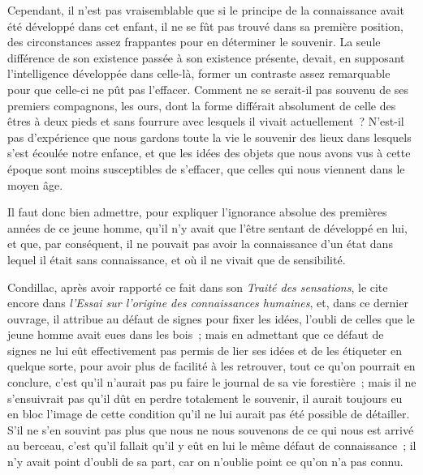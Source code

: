 \documentclass[french,twoside]{book} %
\begin{document}
Cependant, il n’est pas vraisemblable que si le principe de la connaissance avait été développé dans cet enfant, il ne se fût pas trouvé dans sa première position, des circonstances assez frappantes pour en déterminer le souvenir. La seule différence de son existence passée à son existence présente, devait, en supposant l’intelligence développée dans celle-là, former un contraste assez remarquable pour que celle-ci ne pût pas l’effacer. Comment ne se serait-il pas souvenu de ses premiers compagnons, les ours, dont la forme différait absolument de celle des êtres à deux pieds et sans fourrure avec lesquels il vivait actuellement ? N’est-il pas d’expérience que nous gardons toute la vie le souvenir des lieux dans lesquels s’est écoulée notre enfance, et que les idées des objets que nous avons vus à cette époque sont moins susceptibles de s’effacer, que celles qui nous viennent dans le moyen âge.\par
Il faut donc bien admettre, pour expliquer l’ignorance absolue des premières années de ce jeune homme, qu’il n’y avait que l’être sentant de développé en lui, et que, par conséquent, il ne pouvait pas avoir la connaissance d’un état dans lequel il était sans connaissance, et où il ne vivait que de sensibilité.\par
Condillac, après avoir rapporté ce fait dans son {\itshape Traité des sensations}, le cite encore dans {\itshape l’Essai sur l’origine des connaissances humaines}, et, dans ce dernier ouvrage, il attribue au défaut de signes pour fixer les idées, l’oubli de celles que le jeune homme avait eues dans les bois ; mais en admettant que ce défaut de signes ne lui eût effectivement pas permis de lier ses idées et de les étiqueter en quelque sorte, pour avoir plus de facilité à les retrouver, tout ce qu’on pourrait en conclure, c’est qu’il n’aurait pas pu faire le journal de sa vie forestière ; mais il ne s’ensuivrait pas qu’il dût en perdre totalement le souvenir, il aurait toujours eu en bloc l’image de cette condition qu’il ne lui aurait pas été possible de détailler. S’il ne s’en souvint pas plus que nous ne nous souvenons de ce qui nous est arrivé au berceau, c’est qu’il fallait qu’il y eût en lui le même défaut de connaissance ; il n’y avait point d’oubli de sa part, car on n’oublie point ce qu’on n’a pas connu.\par
\end{document}

